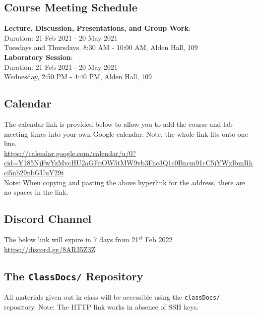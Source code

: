 \documentclass[11pt]{article} %
\begin{document}
\subsection*{\textbf{Course Meeting Schedule}}


\textbf{Lecture, Discussion, Presentations, and Group Work}:\\
\noindent
Duration: 21 Feb 2021 - 20 May 2021\\
Tuesdays and Thursdays, 8:30 AM - 10:00 AM, Alden Hall, 109\\


\noindent
\textbf{Laboratory Session}:\\
Duration: 21 Feb 2021 - 20 May 2021\\
Wednesday, 2:50 PM - 4:40 PM, Alden Hall, 109\\



\subsection*{\textbf{Calendar}}
The calendar link is provided below to allow you to add the course and lab meeting times into your own Google calendar. Note, the whole link fits onto one line.\\
{\footnotesize
\url{https://calendar.google.com/calendar/u/0?cid=Y185NjFwYzMycHU2aGFpOW5tMW9vb3Fnc3Q1c0Bncm91cC5jYWxlbmRhci5nb29nbGUuY29t} }\\
Note: When copying and pasting the above hyperlink for the address, there are no spaces in the link.


\subsection*{\textbf{Discord Channel}}
The below link will expire in 7 days from 21$^{st}$ Feb 2022\\
{\footnotesize
\url{https://discord.gg/8AR35Z3Z} }



\subsection*{\textbf{The {\tt ClassDocs/} Repository}}
All materials given out in class will be accessible using the {\tt classDocs/} repository. Note: The HTTP link works in absence of SSH keys.
\end{document}
